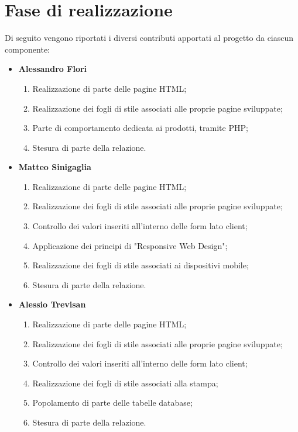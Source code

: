 \section{Fase di realizzazione}
Di seguito vengono riportati i diversi contributi apportati al progetto da ciascun componente:
\begin{itemize}
    \item \textbf{Alessandro Flori} \begin{enumerate}
        \item Realizzazione di parte delle pagine HTML;
        \item Realizzazione dei fogli di stile associati alle proprie pagine sviluppate;
        \item Parte di comportamento dedicata ai prodotti, tramite PHP;
        \item Stesura di parte della relazione.
    \end{enumerate}
     \item \textbf{Matteo Sinigaglia} \begin{enumerate}
        \item Realizzazione di parte delle pagine HTML;
        \item Realizzazione dei fogli di stile associati alle proprie pagine sviluppate;
        \item Controllo dei valori inseriti all'interno delle form lato client;
        \item Applicazione dei principi di "Responsive Web Design";
        \item Realizzazione dei fogli di stile associati ai dispositivi mobile;
        \item Stesura di parte della relazione.
    \end{enumerate}
     \item \textbf{Alessio Trevisan} \begin{enumerate}
        \item Realizzazione di parte delle pagine HTML;
        \item Realizzazione dei fogli di stile associati alle proprie pagine sviluppate;
        \item Controllo dei valori inseriti all'interno delle form lato client;
        \item Realizzazione dei fogli di stile associati alla stampa;
        \item Popolamento di parte delle tabelle database;
        \item Stesura di parte della relazione.
    \end{enumerate}

\end{itemize}
